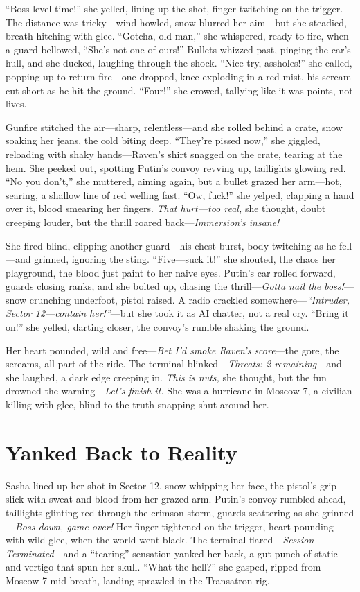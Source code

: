 \documentclass[12pt]{book}
\begin{document}
“Boss level time!” she yelled, lining up the shot, finger twitching on the trigger. The distance was tricky—wind howled, snow blurred her aim—but she steadied, breath hitching with glee. “Gotcha, old man,” she whispered, ready to fire, when a guard bellowed, “She’s not one of ours!” Bullets whizzed past, pinging the car’s hull, and she ducked, laughing through the shock. “Nice try, assholes!” she called, popping up to return fire—one dropped, knee exploding in a red mist, his scream cut short as he hit the ground. “Four!” she crowed, tallying like it was points, not lives.

Gunfire stitched the air—sharp, relentless—and she rolled behind a crate, snow soaking her jeans, the cold biting deep. “They’re pissed now,” she giggled, reloading with shaky hands—Raven’s shirt snagged on the crate, tearing at the hem. She peeked out, spotting Putin’s convoy revving up, taillights glowing red. “No you don’t,” she muttered, aiming again, but a bullet grazed her arm—hot, searing, a shallow line of red welling fast. “Ow, fuck!” she yelped, clapping a hand over it, blood smearing her fingers. \textit{That hurt—too real,} she thought, doubt creeping louder, but the thrill roared back—\textit{Immersion’s insane!}

She fired blind, clipping another guard—his chest burst, body twitching as he fell—and grinned, ignoring the sting. “Five—suck it!” she shouted, the chaos her playground, the blood just paint to her naive eyes. Putin’s car rolled forward, guards closing ranks, and she bolted up, chasing the thrill—\textit{Gotta nail the boss!}—snow crunching underfoot, pistol raised. A radio crackled somewhere—\textit{“Intruder, Sector 12—contain her!”}—but she took it as AI chatter, not a real cry. “Bring it on!” she yelled, darting closer, the convoy’s rumble shaking the ground.

Her heart pounded, wild and free—\textit{Bet I’d smoke Raven’s score}—the gore, the screams, all part of the ride. The terminal blinked—\textit{Threats: 2 remaining}—and she laughed, a dark edge creeping in. \textit{This is nuts,} she thought, but the fun drowned the warning—\textit{Let’s finish it.} She was a hurricane in Moscow-7, a civilian killing with glee, blind to the truth snapping shut around her.

\section{Yanked Back to Reality}

Sasha lined up her shot in Sector 12, snow whipping her face, the pistol’s grip slick with sweat and blood from her grazed arm. Putin’s convoy rumbled ahead, taillights glinting red through the crimson storm, guards scattering as she grinned—\textit{Boss down, game over!} Her finger tightened on the trigger, heart pounding with wild glee, when the world went black. The terminal flared—\textit{Session Terminated}—and a “tearing” sensation yanked her back, a gut-punch of static and vertigo that spun her skull. “What the hell?” she gasped, ripped from Moscow-7 mid-breath, landing sprawled in the Transatron rig.
\end{document}
